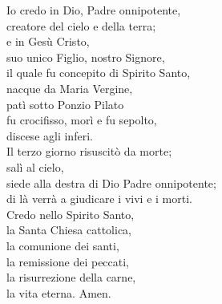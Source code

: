 
\setcounter{numstrofa}{0}

Io credo in Dio, Padre onnipotente,\\
creatore del cielo e della terra;\\
e in Gesù Cristo,\\
suo unico Figlio, nostro Signore,\\
il quale fu concepito di Spirito Santo,\\
nacque da Maria Vergine,\\
patì sotto Ponzio Pilato\\
fu crocifisso, morì e fu sepolto,\\
discese agli inferi.\\
Il terzo giorno risuscitò da morte;\\
salì al cielo,\\
siede alla destra di Dio Padre onnipotente;\\
di là verrà a giudicare i vivi e i morti.\\
Credo nello Spirito Santo,\\
la Santa Chiesa cattolica,\\
la comunione dei santi,\\
la remissione dei peccati,\\
la risurrezione della carne,\\
la vita eterna. Amen.
